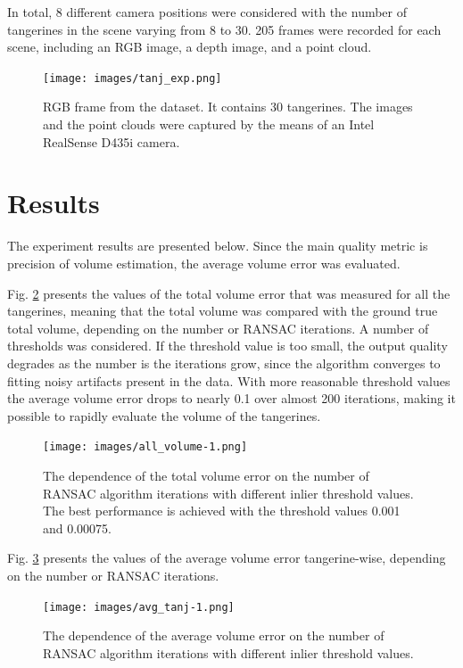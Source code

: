 In total, 8 different camera positions were considered with the number of tangerines in the scene varying from 8 to 30.
205 frames were recorded for each scene, including an RGB image, a depth image, and a point cloud.

\begin{figure}[htbp]
\centerline{\texttt{[image: images/tanj\_exp.png]}}
\caption{RGB frame from the dataset. It contains 30 tangerines. The images and the point clouds were captured by the means of an Intel RealSense D435i camera.}
\label{tanjes}
\end{figure}

\section{Results}

The experiment results are presented below.
Since the main quality metric is precision of volume estimation, the average volume error was evaluated.

Fig. \ref{fig_all} presents the values of the total volume error that was measured for all the tangerines, meaning that the total volume was compared with the ground true total volume, depending on the number or RANSAC iterations.
A number of thresholds was considered.
If the threshold value is too small, the output quality degrades as the number is the iterations grow, since the algorithm converges to fitting noisy artifacts present in the data.
With more reasonable threshold values the average volume error drops to nearly 0.1 over almost 200 iterations, making it possible to rapidly evaluate the volume of the tangerines.

\begin{figure}[htbp]
\centerline{\texttt{[image: images/all\_volume-1.png]}}
\caption{The dependence of the total volume error on the number of RANSAC algorithm iterations with different inlier threshold values. The best performance is achieved with the threshold values 0.001 and 0.00075.}
\label{fig_all}
\end{figure}

Fig. \ref{fig_avg} presents the values of the average volume error tangerine-wise, depending on the number or RANSAC iterations.

\begin{figure}[htbp]
\centerline{\texttt{[image: images/avg\_tanj-1.png]}}
\caption{The dependence of the average volume error on the number of RANSAC algorithm iterations with different inlier threshold values.}
\label{fig_avg}
\end{figure}

